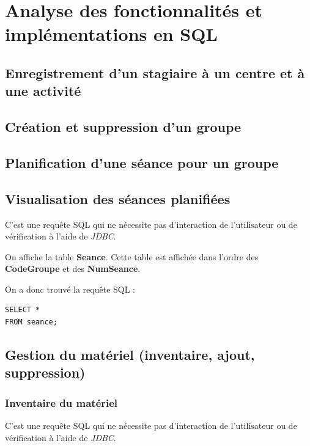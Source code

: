 \documentclass[10pt]{article}
\begin{document}
\section{Analyse des fonctionnalités et implémentations en SQL}

\subsection{Enregistrement d'un stagiaire à un centre et à une activité}

\subsection{Création et suppression d'un groupe}

\subsection{Planification d'une séance pour un groupe}

\subsection{Visualisation des séances planifiées}

C'est une requête SQL qui ne nécessite pas d'interaction de l'utilisateur ou de vérification à l'aide de \emph{JDBC}.

On affiche la table \textbf{Seance}. Cette table est affichée dans l'ordre des \textbf{CodeGroupe} et des \textbf{NumSeance}.

On a donc trouvé la requête SQL :
\begin{small}
\begin{verbatim}
SELECT *
FROM seance;
\end{verbatim}
\end{small}

\subsection{Gestion du matériel (inventaire, ajout, suppression)}

\subsubsection{Inventaire du matériel}

C'est une requête SQL qui ne nécessite pas d'interaction de l'utilisateur ou de vérification à l'aide de \emph{JDBC}.
\end{document}
